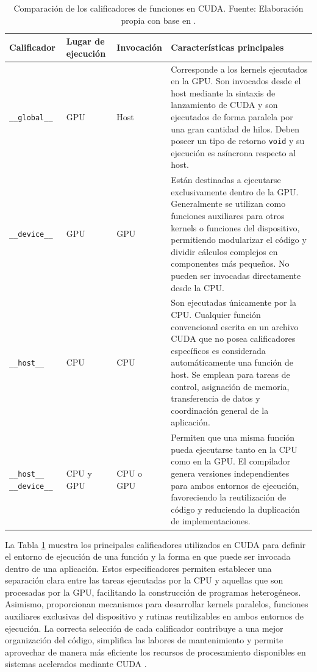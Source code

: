 \begin{table}[H]
\centering
\caption{Comparación de los calificadores de funciones en CUDA. Fuente: Elaboración propia con base en \cite{nvidiaProgrammingGuide,hostdevice}.}
\label{tab:funciones_cuda}
\begin{tabular}{|>{\raggedright\arraybackslash}p{2.3cm}|>{\raggedright\arraybackslash}p{2.3cm}|>{\raggedright\arraybackslash}p{2.3cm}|p{6.8cm}|}
\hline
\textbf{Calificador} & \textbf{Lugar de ejecución} & \textbf{Invocación} & \textbf{Características principales} \\
\hline
\texttt{\_\_global\_\_} & GPU & Host & Corresponde a los kernels ejecutados en la GPU. Son invocados desde el host mediante la sintaxis de lanzamiento de CUDA y son ejecutados de forma paralela por una gran cantidad de hilos. Deben poseer un tipo de retorno \texttt{void} y su ejecución es asíncrona respecto al host. \\
\hline
\texttt{\_\_device\_\_} & GPU & GPU & Están destinadas a ejecutarse exclusivamente dentro de la GPU. Generalmente se utilizan como funciones auxiliares para otros kernels o funciones del dispositivo, permitiendo modularizar el código y dividir cálculos complejos en componentes más pequeños. No pueden ser invocadas directamente desde la CPU. \\
\hline
\texttt{\_\_host\_\_} & CPU & CPU & Son ejecutadas únicamente por la CPU. Cualquier función convencional escrita en un archivo CUDA que no posea calificadores específicos es considerada automáticamente una función de host. Se emplean para tareas de control, asignación de memoria, transferencia de datos y coordinación general de la aplicación. \\
\hline
\texttt{\_\_host\_\_ \_\_device\_\_} & CPU y GPU & CPU o GPU & Permiten que una misma función pueda ejecutarse tanto en la CPU como en la GPU. El compilador genera versiones independientes para ambos entornos de ejecución, favoreciendo la reutilización de código y reduciendo la duplicación de implementaciones. \\
\hline
\end{tabular}
\end{table}

La Tabla \ref{tab:funciones_cuda} muestra los principales calificadores utilizados en CUDA para definir el entorno de ejecución de una función y la forma en que puede ser invocada dentro de una aplicación. Estos especificadores permiten establecer una separación clara entre las tareas ejecutadas por la CPU y aquellas que son procesadas por la GPU, facilitando la construcción de programas heterogéneos. Asimismo, proporcionan mecanismos para desarrollar kernels paralelos, funciones auxiliares exclusivas del dispositivo y rutinas reutilizables en ambos entornos de ejecución. La correcta selección de cada calificador contribuye a una mejor organización del código, simplifica las labores de mantenimiento y permite aprovechar de manera más eficiente los recursos de procesamiento disponibles en sistemas acelerados mediante CUDA \cite{nvidiaProgrammingGuide,hostdevice}.


